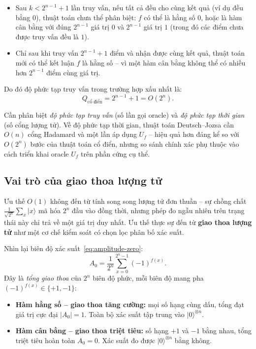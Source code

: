 \begin{itemize}
    \item Sau $k < 2^{n-1}+1$ lần truy vấn, nếu tất cả đều cho cùng kết quả
          (ví dụ đều bằng $0$), thuật toán chưa thể phân biệt: $f$ có thể là
          hằng số $0$, hoặc là hàm cân bằng với đúng $2^{n-1}$ giá trị $0$ và
          $2^{n-1}$ giá trị $1$ (trong đó các điểm chưa được truy vấn đều là $1$).
    \item Chỉ sau khi truy vấn $2^{n-1}+1$ điểm và nhận được cùng kết quả, thuật
          toán mới có thể kết luận $f$ là hằng số -- vì một hàm cân bằng không
          thể có nhiều hơn $2^{n-1}$ điểm cùng giá trị.
\end{itemize}
 
Do đó độ phức tạp truy vấn trong trường hợp xấu nhất là:
\begin{equation}
    Q_{\text{cổ điển}} = 2^{n-1} + 1 = O(2^n).
    \label{eq:classical-complexity}
\end{equation}
 
\begin{remark}
Cần phân biệt \emph{độ phức tạp truy vấn} (số lần gọi oracle) và \emph{độ phức
tạp thời gian} (số cổng lượng tử). Về độ phức tạp thời gian, thuật toán
Deutsch--Jozsa cần $O(n)$ cổng Hadamard và một lần áp dụng $U_f$ -- hiệu quả
hơn đáng kể so với $O(2^n)$ bước của thuật toán cổ điển, nhưng so sánh chính
xác phụ thuộc vào cách triển khai oracle $U_f$ trên phần cứng cụ thể.
\end{remark}
 
\subsection*{Vai trò của giao thoa lượng tử}
 
Ưu thế $O(1)$ không đến từ tính song song lượng tử đơn thuần -- sự chồng chất
$\frac{1}{\sqrt{2^n}}\sum_x |x\rangle$ mã hóa $2^n$ đầu vào đồng thời, nhưng
phép đo ngẫu nhiên trên trạng thái này chỉ trả về một giá trị duy nhất. Ưu thế
thực sự đến từ \textbf{giao thoa lượng tử} như một cơ chế kiểm soát có chọn
lọc phân bố xác suất.
 
Nhìn lại biên độ xác suất~\eqref{eq:amplitude-zero}:
$$A_0 = \frac{1}{2^n}\sum_{x=0}^{2^n-1}(-1)^{f(x)}.$$
Đây là \emph{tổng giao thoa} của $2^n$ biên độ phức, mỗi biên độ mang pha
$(-1)^{f(x)} \in \{+1, -1\}$:
 
\begin{itemize}
    \item \textbf{Hàm hằng số -- giao thoa tăng cường:} mọi số hạng cùng dấu,
          tổng đạt giá trị cực đại $|A_0| = 1$. Toàn bộ xác suất tập trung vào
          $|0\rangle^{\otimes n}$.
    \item \textbf{Hàm cân bằng -- giao thoa triệt tiêu:} số hạng $+1$ và $-1$
          bằng nhau, tổng triệt tiêu hoàn toàn $A_0 = 0$. Xác suất đo được
          $|0\rangle^{\otimes n}$ bằng không.
\end{itemize}
 
